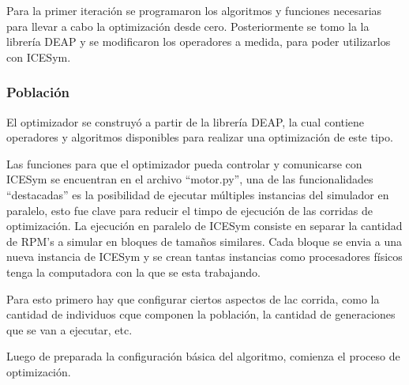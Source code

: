 Para la primer iteración se programaron los algoritmos y funciones necesarias
para llevar a cabo la optimización desde cero.
%
Posteriormente se tomo la la librería DEAP \cite{DEAP_JMLR2012} y se
modificaron los operadores a medida, para poder utilizarlos con ICESym.

\subsubsection{Población}



































El optimizador se construyó a partir de la librería DEAP\cite{DEAP_JMLR2012}, la
cual contiene operadores y algoritmos disponibles para realizar una optimización
de este tipo.

Las funciones para que el optimizador pueda controlar y comunicarse con ICESym
se encuentran en el archivo ``motor.py'', una de las funcionalidades ``destacadas''
es la posibilidad de ejecutar múltiples instancias del simulador en paralelo, esto
fue clave para reducir el timpo de ejecución de las corridas de optimización.
%
La ejecución en paralelo de ICESym consiste en separar la cantidad de RPM's a simular
en bloques de tamaños similares.
%
Cada bloque se envia a una nueva instancia de ICESym y se crean tantas instancias
como procesadores físicos tenga la computadora con la que se esta trabajando.




Para esto primero hay que configurar ciertos aspectos de lac corrida, como la
cantidad de individuos cque componen la población, la cantidad de generaciones
que se van a ejecutar, etc.

Luego de preparada la configuración básica del algoritmo, comienza el proceso
de optimización.

